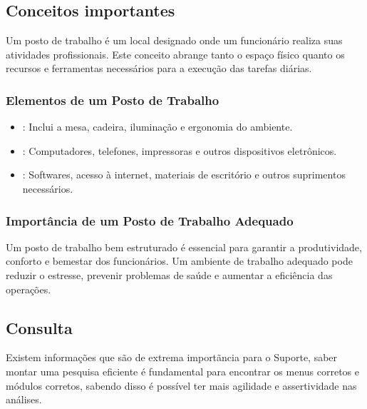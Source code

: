 \documentclass[a4paper,10pt,portuges]{sphinxmanual}
\begin{document}
\sphinxstepscope


\subsection{Conceitos importantes}
\label{\detokenize{conceitos:conceitos-importantes}}\label{\detokenize{conceitos::doc}}
\sphinxAtStartPar
Um posto de trabalho é um local designado onde um funcionário realiza suas atividades profissionais. Este conceito abrange tanto o espaço físico quanto os recursos e ferramentas necessários para a execução das tarefas diárias.


\subsubsection{Elementos de um Posto de Trabalho}
\label{\detokenize{conceitos:elementos-de-um-posto-de-trabalho}}\begin{itemize}
\item {} 
\sphinxAtStartPar
{}: Inclui a mesa, cadeira, iluminação e ergonomia do ambiente.

\item {} 
\sphinxAtStartPar
{}: Computadores, telefones, impressoras e outros dispositivos eletrônicos.

\item {} 
\sphinxAtStartPar
{}: Softwares, acesso à internet, materiais de escritório e outros suprimentos necessários.

\end{itemize}


\subsubsection{Importância de um Posto de Trabalho Adequado}
\label{\detokenize{conceitos:importancia-de-um-posto-de-trabalho-adequado}}
\sphinxAtStartPar
Um posto de trabalho bem estruturado é essencial para garantir a produtividade, conforto e bem\sphinxhyphen{}estar dos funcionários. Um ambiente de trabalho adequado pode reduzir o estresse, prevenir problemas de saúde e aumentar a eficiência das operações.

\noindent{}

\sphinxstepscope


\subsection{Consulta}
\label{\detokenize{Consulta:consulta}}\label{\detokenize{Consulta::doc}}
\sphinxAtStartPar
Existem informações que são de extrema importãncia para o Suporte,
saber montar uma pesquisa eficiente é fundamental para encontrar os
menus corretos e módulos corretos, sabendo disso é possível ter mais
agilidade e assertividade nas análises.

\noindent{}



\renewcommand{\indexname}{Índice}
\printindex
\end{document}
